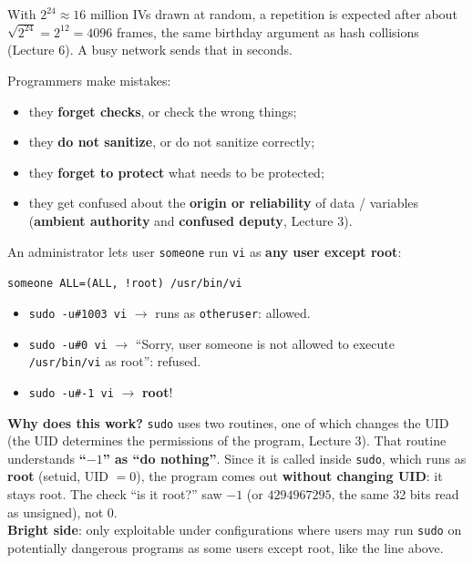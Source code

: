 \begin{rembox}[title={Why every 5000 frames? (the birthday paradox)}]
With $2^{24} \approx 16$ million IVs drawn at random, a repetition is expected after about
$\sqrt{2^{24}} = 2^{12} = 4096$ frames, the same birthday argument as hash collisions (Lecture 6).
A busy network sends that in seconds.
\end{rembox}

\begin{defnbox}[title={Implementation flaws: bugs, bugs and more bugs}]
Programmers make mistakes:
\begin{itemize}
  \item they \textbf{forget checks}, or check the wrong things;
  \item they \textbf{do not sanitize}, or do not sanitize correctly;
  \item they \textbf{forget to protect} what needs to be protected;
  \item they get confused about the \textbf{origin or reliability} of data / variables
        (\textbf{ambient authority} and \textbf{confused deputy}, Lecture 3).
\end{itemize}
\end{defnbox}

\begin{exbox}[title={The \texttt{sudo} bug (CVE-2019-14287)}]
An administrator lets user \texttt{someone} run \texttt{vi} as \textbf{any user except root}:
\begin{center}
\texttt{someone ALL=(ALL, !root) /usr/bin/vi}
\end{center}
\begin{itemize}
  \item \texttt{sudo -u\#1003 vi} $\to$ runs as \texttt{otheruser}: allowed.
  \item \texttt{sudo -u\#0 vi} $\to$ ``Sorry, user someone is not allowed to execute
        \texttt{/usr/bin/vi} as root'': refused.
  \item \texttt{sudo -u\#-1 vi} $\to$ \textbf{root}!
\end{itemize}
\textbf{Why does this work?} \texttt{sudo} uses two routines, one of which changes the UID (the
UID determines the permissions of the program, Lecture 3). That routine understands
\textbf{``$-1$'' as ``do nothing''}. Since it is called inside \texttt{sudo}, which runs as
\textbf{root} (setuid, UID $= 0$), the program comes out \textbf{without changing UID}: it stays
root. The check ``is it root?'' saw $-1$ (or $4294967295$, the same 32 bits read as unsigned), not
$0$. \\
\textbf{Bright side}: only exploitable under configurations where users may run \texttt{sudo} on
potentially dangerous programs as some users except root, like the line above.
\end{exbox}

